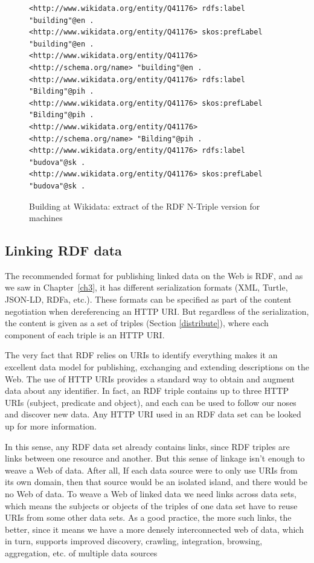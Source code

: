 \begin{figure}
 \begin{lstlisting}
<http://www.wikidata.org/entity/Q41176> rdfs:label "building"@en .
<http://www.wikidata.org/entity/Q41176> skos:prefLabel "building"@en .
<http://www.wikidata.org/entity/Q41176> <http://schema.org/name> "building"@en .
<http://www.wikidata.org/entity/Q41176> rdfs:label "Bilding"@pih .
<http://www.wikidata.org/entity/Q41176> skos:prefLabel "Bilding"@pih .
<http://www.wikidata.org/entity/Q41176> <http://schema.org/name> "Bilding"@pih .
<http://www.wikidata.org/entity/Q41176> rdfs:label "budova"@sk .
<http://www.wikidata.org/entity/Q41176> skos:prefLabel "budova"@sk .
\end{lstlisting}
    \caption{Building at Wikidata: extract of the RDF N-Triple version for
machines}
    \label{fig:ch5.10}
\end{figure}




\hypertarget{linking-rdf-data}{%
\subsection{Linking RDF data}\label{linking-rdf-data}}

The recommended format for publishing linked data on the Web is RDF,  and as we saw in Chapter~\ref{ch3}, it 
has different serialization formats (XML, Turtle,
JSON-LD, RDFa, etc.).  These formats can be specified as   part of the content negotiation when
dereferencing an HTTP URI.   But regardless of the serialization, the content is given as 
a set of triples (Section \ref{distribute}), where each component of each triple is an HTTP URI. 

The very fact that RDF relies on URIs to identify
everything makes it an excellent data model for publishing,
exchanging and extending descriptions on the Web. The use of HTTP URIs
provides a standard way to obtain and augment data about any 
identifier. In fact, an RDF triple contains up to three HTTP URIs
(subject, predicate and object), and each can be used to follow our
noses and discover new data. Any HTTP URI used in an RDF data set
can be looked up for more information.

In this sense,   any RDF data set already contains links, since
RDF triples are links between one resource and another.  
But this sense of linkage isn't enough to weave a Web of data.  After all, 
If each data source were to only use  URIs from  its own domain, then
that source would be an isolated island,  and there would be no
Web of data.  To
weave a Web of linked data we need links across data sets,  which means the
subjects or objects of the triples of one data set have to reuse
URIs from some other data sets.  As a good practice, the more such links, the better, 
since it means we have a more densely interconnected web of data, which in turn, supports
improved discovery,  crawling, integration, browsing,
aggregation, etc. of multiple data sources

